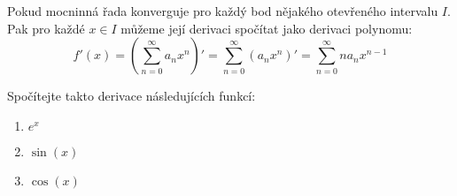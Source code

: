 Pokud mocninná řada konverguje pro každý bod nějakého otevřeného intervalu $I$.
Pak pro každé $x \in I$ můžeme její derivaci spočítat jako derivaci polynomu:
$$f'(x) = \left( \sum_{n=0}^{\infty} a_n x^n \right)' = \sum_{n=0}^{\infty} \left( a_n x^n \right)' = \sum_{n=0}^{\infty} n a_n x^{n-1}$$

Spočítejte takto derivace následujících funkcí:

\begin{enumerate}

	\item  $e^x$


	\item  $\sin(x)$


	\item  $\cos(x)$


\end{enumerate}

